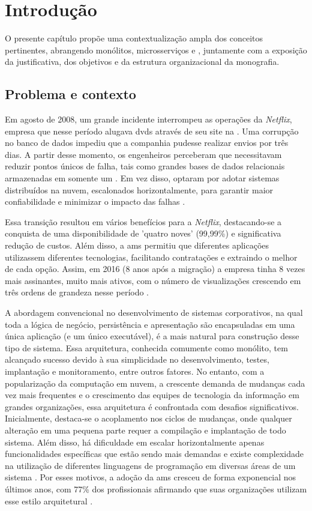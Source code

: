 \chapter{Introdução}
\label{cap:introducao}

O presente capítulo propõe uma contextualização ampla dos conceitos pertinentes, abrangendo monólitos, microsserviços e , juntamente com a exposição da justificativa, dos objetivos e da estrutura organizacional da monografia.

\section{Problema e contexto}

Em agosto de 2008, um grande incidente interrompeu as operações da \emph{Netflix}, empresa que nesse período alugava \acrshort{dvd}s através de seu site na . Uma corrupção no banco de dados impediu que a companhia pudesse realizar envios por três dias. A partir desse momento, os engenheiros perceberam que necessitavam reduzir pontos únicos de falha, tais como grandes bases de dados relacionais armazenadas em somente um . Em vez disso, optaram por adotar sistemas distribuídos na nuvem, escalonados horizontalmente, para garantir maior confiabilidade e minimizar o impacto das falhas \cite{netflixMigration}.

Essa transição resultou em vários benefícios para a \emph{Netflix}, destacando-se a conquista de uma disponibilidade de 'quatro noves' (99,99\%) e significativa redução de custos. Além disso, a \acrfull{ams} permitiu que diferentes aplicações utilizassem diferentes tecnologias, facilitando contratações e extraindo o melhor de cada opção. Assim, em 2016 (8 anos após a migração) a empresa tinha 8 vezes mais assinantes, muito mais ativos, com o número de visualizações crescendo em três ordens de grandeza nesse período \cite{netflixMigration}.

A abordagem convencional no desenvolvimento de sistemas corporativos, na qual toda a lógica de negócio, persistência e apresentação são encapsuladas em uma única aplicação (e um único executável), é a mais natural para construção desse tipo de sistema. Essa arquitetura, conhecida comumente como monólito, tem alcançado sucesso devido à sua simplicidade no desenvolvimento, testes, implantação e monitoramento, entre outros fatores. No entanto, com a popularização da computação em nuvem, a crescente demanda de mudanças cada vez mais frequentes e o crescimento das equipes de tecnologia da informação em grandes organizações, essa arquitetura é confrontada com desafios significativos. Inicialmente, destaca-se o acoplamento nos ciclos de mudanças, onde qualquer alteração em uma pequena parte requer a compilação e implantação de todo sistema. Além disso, há dificuldade em escalar horizontalmente apenas funcionalidades específicas que estão sendo mais demandas e existe complexidade na utilização de diferentes linguagens de programação em diversas áreas de um sistema \cite{microservices}. Por esses motivos, a adoção da \acrlong{ams} cresceu de forma exponencial nos últimos anos, com 77\% dos profissionais afirmando que suas organizações utilizam esse estilo arquitetural \cite{microserviceAdoption}.


